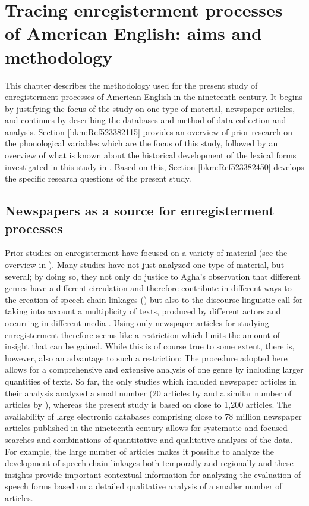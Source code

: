 \chapter[Tracing enregisterment processes of American English]{Tracing enregisterment processes of American English: aims and methodology}
\label{bkm:Ref513018040}\hypertarget{Toc63021218}{}\label{bkm:Ref13470656}
This chapter describes the methodology used for the present study of enregisterment processes of American English in the nineteenth century. It begins by justifying the focus of the study on one type of material, newspaper articles, and continues by describing the databases and method of data collection and analysis. Section \ref{bkm:Ref523382115} provides an overview of prior research on the phonological variables which are the focus of this study, followed by an overview of what is known about the historical development of the lexical forms investigated in this study in . Based on this, Section \ref{bkm:Ref523382450} develops the specific research questions of the present study.


\section{Newspapers as a source for enregisterment processes}
\label{bkm:Ref524018691}\hypertarget{Toc63021219}{}
Prior studies on enregisterment have focused on a variety of material (see the overview in ). Many studies have not just analyzed one type of material, but several; by doing so, they not only do justice to Agha’s observation that different genres have a different circulation and therefore contribute in different ways to the creation of speech chain linkages (\citeyear[259]{Agha2003}) but also to the discourse-linguistic call for taking into account a multiplicity of texts, produced by different actors and occurring in different media \citep[187--188]{Spitzmuller2011}. Using only newspaper articles for studying enregisterment therefore seems like a restriction which limits the amount of insight that can be gained. While this is of course true to some extent, there is, however, also an advantage to such a restriction: The procedure adopted here allows for a comprehensive and extensive analysis of one genre by including larger quantities of texts. So far, the only studies which included newspaper articles in their analysis analyzed a small number (20 articles by \citealt{Johnstone2006} and a similar number of articles by \citealt{Remlinger2009}), whereas the present study is based on close to 1,200 articles. The availability of large electronic databases comprising close to 78 million newspaper articles published in the nineteenth century allows for systematic and focused searches and combinations of quantitative and qualitative analyses of the data. For example, the large number of articles makes it possible to analyze the development of speech chain linkages both temporally and regionally and these insights provide important contextual information for analyzing the evaluation of speech forms based on a detailed qualitative analysis of a smaller number of articles.


